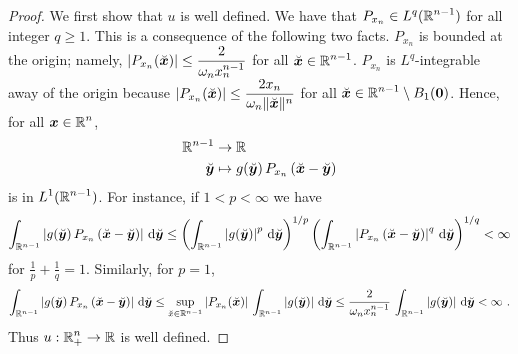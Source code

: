 
\begin{proof}
 We first show that $u$ is well defined.  We have that
$\displaystyle P_{x_n} \in L^q(\mathbb{R}^{n-1})$ for all integer $q \geq 1$.
This is a consequence of the following two facts.
$P_{x_n}$ is bounded at the origin; namely,
$\displaystyle \left| P_{x_n}(\breve{{\bm{x}}})\right| \leq 
\frac{2}{\omega_{n} x_n^{n-1}}$ for all
$\displaystyle \breve{{\bm{x}}} \in \mathbb{R}^{n-1}$.
$P_{x_n}$ is $\displaystyle L^q$-integrable away of the origin because
$\displaystyle \left| P_{x_n}(\breve{{\bm{x}}})\right| \leq
\frac{2 x_n}{\omega_{n} \|\breve{{\bm{x}}}\|^n}$
for all $\displaystyle \breve{{\bm{x}}} \in \mathbb{R}^{n-1}\setminus B_1({\bm{0}})$.
Hence, for all $\displaystyle {\bm{x}}\in \mathbb{R}^n$,
\begin{align*}
\mathbb{R}^{n-1} & \rightarrow \mathbb{R} \\
\breve{{\bm{y}}} & \mapsto g(\breve{{\bm{y}}})\,
P_{x_n}\left(\breve{{\bm{x}}} - \breve{{\bm{y}}}\right)
\end{align*}
is in $\displaystyle L^1(\mathbb{R}^{n-1})$.  For instance, if $1<p<\infty$ we have
\[
\int_{\mathbb{R}^{n-1}} \left| g(\breve{{\bm{y}}})\,
P_{x_n}\left(\breve{{\bm{x}}} - \breve{{\bm{y}}}\right) \right|
\,\mathrm{d}{\breve{{\bm{y}}}}
\leq
\left( \int_{\mathbb{R}^{n-1}} \left|g(\breve{{\bm{y}}}) \right|^p
\,\mathrm{d}{\breve{{\bm{y}}}} \right)^{1/p}
\left( \int_{\mathbb{R}^{n-1}} \left|
P_{x_n}\left(\breve{{\bm{x}}} - \breve{{\bm{y}}}\right) \right|^q
\,\mathrm{d}{\breve{{\bm{y}}}} \right)^{1/q} < \infty
\]
for $\displaystyle \frac{1}{p} + \frac{1}{q} = 1$.
Similarly, for $p=1$,
\[
\int_{\mathbb{R}^{n-1}} \left| g(\breve{{\bm{y}}})\,
P_{x_n}\left(\breve{{\bm{x}}} - \breve{{\bm{y}}}\right) \right|
\,\mathrm{d}{\breve{{\bm{y}}}}
\leq \sup_{\breve{x} \in \mathbb{R}^{n-1}} |P_{x_n}(\breve{{\bm{x}}})|
\, \int_{\mathbb{R}^{n-1}} \left|g(\breve{{\bm{y}}}) \right|
\,\mathrm{d}{\breve{{\bm{y}}}}
\leq \frac{2}{\omega_n x_n^{n-1}}
\, \int_{\mathbb{R}^{n-1}} \left|g(\breve{{\bm{y}}}) \right| \,\mathrm{d}{\breve{{\bm{y}}}}
< \infty \ .
\]
Thus $\displaystyle u:\mathbb{R}^n_+\rightarrow \mathbb{R}$ is well defined.


\end{proof}
